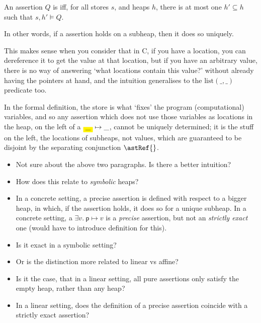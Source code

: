 \begin{definition}%
\label{def:precise-assertion}
    \AP{} An assertion $Q$ is  iff, for all stores $s$, and heaps
    $h$, there is at most one $h' \subseteq{} h$ such that $s , h' \vDash{} Q$.

    In other words, if a  assertion holds on a subheap, then it
    does so uniquely.
\end{definition}

This makes sense when you consider that in C, if you have a location, you can
dereference it to get the value at that location, but if you have an arbitrary
value, there is no way of answering `what locations contain this
value?'
without already having the pointers at hand, and the intuition generalises to
the $\mathrm{list}(\_, \_)$ predicate too.

In the formal definition, the store is what `fixes' the program (computational)
variables, and so any assertion which does not use those variables as locations
in the heap, on the left of a $\colorbox{yellow}{\_} \mapsto{} \_$, cannot be
uniquely determined; it is the stuff on the left, the locations of subheaps,
not values, which are guaranteed to be disjoint by the separating conjunction
$\astRef{}$.

\begin{itemize}
    \item Not sure about the above two paragraphs. Is there a better intuition?
    \item How does this relate to \emph{symbolic} heaps?
    \item In a concrete setting, a precise assertion is defined with respect to
        a bigger heap, in which, if the assertion holds, it does so for a
        unique subheap. In a concrete setting, a $\exists v.\ \mathsf{p}
        \mapsto{} v$ is a \emph{precise} assertion, but not an \emph{strictly
        exact} one (would have to introduce definition for this).
    \item Is it exact in a symbolic setting?
    \item Or is the distinction more related to linear vs affine?
    \item Is it the case, that in a linear setting, all pure assertions only
        satisfy the empty heap, rather than any heap?
    \item In a linear setting, does the definition of a precise assertion
        coincide with a strictly exact assertion?
\end{itemize}

